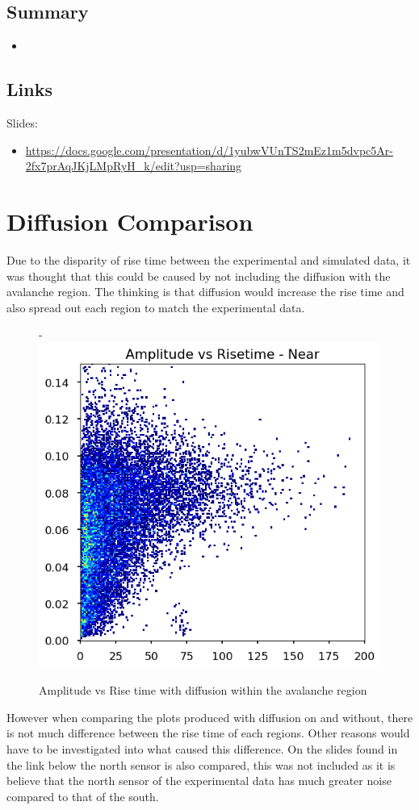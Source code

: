 \documentclass[a4paper]{article}
\begin{document}
\subsection{Summary}
\begin{itemize}
    \item {} 
\end{itemize}
\subsection{Links}
Slides: 
\begin{itemize}
    \item[] \url{https://docs.google.com/presentation/d/1yubwVUnTS2mEz1m5dvpc5Ar-2fx7prAqJKjLMpRyH_k/edit?usp=sharing}
\end{itemize}
\section{Diffusion Comparison}
Due to the disparity of rise time between the experimental and simulated data, it was thought that this could be caused by not including the diffusion with the avalanche region. The thinking is that diffusion would increase the rise time and also spread out each region to match the experimental data.
\begin{figure}[H]-
        \centering
        \includegraphics[width=1\linewidth]{diff/steel_achinos-2d_South_diff.png}
        \caption{Amplitude vs Rise time with diffusion within the avalanche region}
        \label{fig:south2d}
        \end{figure}
\noindent However when comparing the plots produced with diffusion on and without, there is not much difference between the rise time of each regions. Other reasons would have to be investigated into what caused this difference.
\newline On the slides found in the link below the north sensor is also compared, this was not included as it is believe that the north sensor of the experimental data has much greater noise compared to that of the south. 
\end{document}
